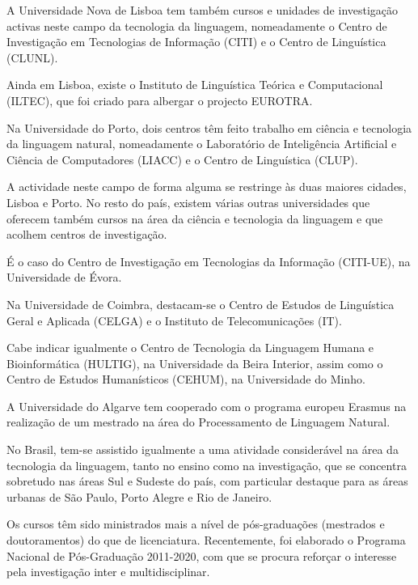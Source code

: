 \begin{multicols}{2}
A Universidade Nova de Lisboa tem também cursos e unidades de investigação activas
neste campo da tecnologia da linguagem, nomeadamente o Centro de Investigação em Tecnologias de Informação (CITI) 
e o Centro de Linguística (CLUNL).

Ainda em Lisboa, existe o Instituto de Linguística Teórica e Computacional (ILTEC), que foi criado para albergar 
o projecto EUROTRA. 

Na Universidade do Porto, dois centros têm feito trabalho em ciência e tecnologia da linguagem natural,
nomeadamente o Laboratório de Inteligência Artificial e Ciência de Computadores (LIACC) e o Centro de Linguística (CLUP).

A actividade neste campo de forma alguma se restringe às duas maiores cidades, Lisboa e Porto. 
No resto do país, existem várias outras universidades que oferecem também  cursos na área da ciência e tecnologia da linguagem 
e que acolhem centros de investigação.

É o caso do Centro de Investigação em Tecnologias da Informação (CITI-UE), na Universidade de Évora.

Na Universidade de Coimbra, destacam-se o Centro de Estudos de Linguística Geral e Aplicada (CELGA) e o 
Instituto de Telecomunicações (IT).

Cabe indicar igualmente o Centro de Tecnologia da Linguagem Humana e Bioinformática (HULTIG), na Universidade da Beira Interior,
assim como o Centro de Estudos Humanísticos (CEHUM), na Universidade do Minho.

A Universidade do Algarve tem cooperado com o programa europeu Erasmus na realização de um mestrado na área 
do Processamento de Linguagem Natural.


No Brasil, tem-se assistido igualmente a uma atividade considerável na área da tecnologia da linguagem, tanto no ensino como na investigação, 
que se concentra sobretudo nas áreas Sul e Sudeste do país, com particular destaque para as áreas urbanas de São Paulo, Porto Alegre e Rio de Janeiro. 

Os cursos têm sido ministrados mais a nível de pós-graduações (mestrados e doutoramentos) do que de licenciatura. 
Recentemente, foi elaborado o Programa Nacional de Pós-Graduação 2011-2020, com que se procura reforçar o interesse pela investigação inter e multidisciplinar.


\end{multicols}
